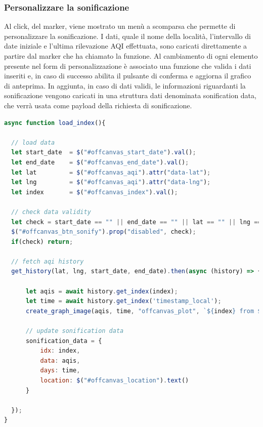 \subsubsection{Personalizzare la sonificazione}
Al click, del marker, viene mostrato un menù a scomparsa che permette di personalizzare la sonificazione.
I dati, quale il nome della località, l'intervallo di date iniziale e l'ultima rilevazione AQI effettuata, sono caricati direttamente a partire dal marker che ha chiamato la funzione.
Al cambiamento di ogni elemento presente nel form di personalizzazione è associato una funzione che valida i dati inseriti e, in caso di successo abilita il pulsante di conferma e aggiorna il grafico di anteprima.
In aggiunta, in caso di dati validi, le informazioni riguardanti la sonificazione vengono caricati in una struttura dati denominata sonification data, che verrà usata come payload della richiesta di sonificazione.
\begin{lstlisting}[language=Javascript]
async function load_index(){

  // load data
  let start_date  = $("#offcanvas_start_date").val();
  let end_date    = $("#offcanvas_end_date").val();
  let lat         = $("#offcanvas_aqi").attr("data-lat");
  let lng         = $("#offcanvas_aqi").attr("data-lng");
  let index       = $("#offcanvas_index").val();
  
  // check data validity
  let check = start_date == "" || end_date == "" || lat == "" || lng == "" || index == "" || start_date >= end_date;
  $("#offcanvas_btn_sonify").prop("disabled", check);
  if(check) return;

  // fetch aqi history
  get_history(lat, lng, start_date, end_date).then(async (history) => {

      let aqis = await history.get_index(index);
      let time = await history.get_index('timestamp_local');
      create_graph_image(aqis, time, "offcanvas_plot", `${index} from ${start_date} to ${end_date}`);

      // update sonification data
      sonification_data = {
          idx: index,
          data: aqis,
          days: time,
          location: $("#offcanvas_location").text()
      }

  });
}
\end{lstlisting}

